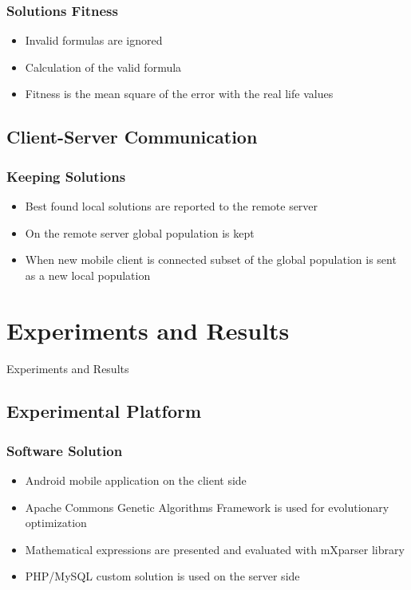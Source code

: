 \documentclass{beamer}
\begin{document}
\begin{frame}
\frametitle{Solutions Fitness}
\begin{itemize}
	\item Invalid formulas are ignored
	\item Calculation of the valid formula 
	\item Fitness is the mean square of the error with the real life values
\end{itemize}
\end{frame}

\subsection{Client-Server Communication}

\begin{frame}
\frametitle{Keeping Solutions}
\begin{itemize}
	\item Best found local solutions are reported to the remote server
	\item On the remote server global population is kept
	\item When new mobile client is connected subset of the global population is sent as a new local population
\end{itemize}
\end{frame}

\section{Experiments and Results}

\begin{frame}
\center \huge{Experiments and Results}
\end{frame}

\subsection{Experimental Platform}

\begin{frame}
\frametitle{Software Solution}
\begin{itemize}
	\item Android mobile application on the client side
	\item Apache Commons Genetic Algorithms Framework is used for evolutionary optimization
	\item Mathematical expressions are presented and evaluated with mXparser library
	\item PHP/MySQL custom solution is used on the server side
\end{itemize}
\end{frame}
\end{document}
